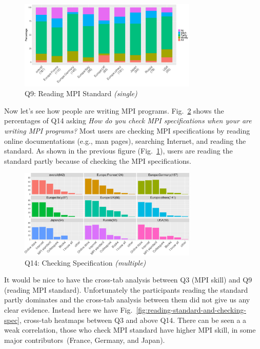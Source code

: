 \documentclass[preprint,5p,times]{elsarticle}
\def\myquote#1{{\it #1}}
\def\mcountries{major contributors}%
\begin{document}
\begin{figure}[htb]
\begin{center}
\includegraphics[width=8.5cm]{R-scripts/Q9.pdf}
\caption{Q9: Reading MPI Standard {\it(single)}}
\label{fig:reading-standard}
\end{center}
\end{figure}

Now let's see how people are writing MPI
programs. Fig.~\ref{fig:checking-spec} shows the percentages of Q14
asking \myquote{How do you check MPI specifications when your are writing MPI
programs?} Most users are checking MPI specifications by reading online
documentations (e.g., man pages), searching Internet, and reading the
standard. As shown in the previous figure
(Fig.~\ref{fig:reading-standard}), users are reading the standard
partly because of checking the MPI specifications.

\begin{figure}[htb]
\begin{center}
\includegraphics[width=8.5cm]{R-scripts/Q14.pdf}
\caption{Q14: Checking Specification {\it(multiple)}}
\label{fig:checking-spec}
\end{center}
\end{figure}

It would be nice to have the cross-tab analysis between Q3 (MPI skill)
and Q9 (reading MPI standard). Unfortunately the participants reading
the standard partly dominates and the cross-tab analysis
between them did not give us any clear evidence.  Instead here we have
Fig.~\ref{fig:reading-standard-and-checking-spec}, cross-tab
heatmaps between Q3 and above Q14. There can be seen a a weak
correlation, those who check MPI standard have higher MPI skill,
in some \mcountries\  (France, Germany, and Japan).
\end{document}
